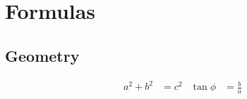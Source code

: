 \section*{Formulas}

\subsection*{Geometry}

\begin{align*}
	a^2 + b^2 &= c^2
	&
	\tan \phi &= \frac{b}{a}
\end{align*}
